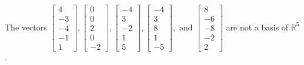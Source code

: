 \begin{exercise}
\begin{exerciseStatement}
  \end{exerciseStatement}
  \begin{exerciseAnswer}
   The vectors \(\left[\begin{array}{r}
4 \\
-3 \\
-4 \\
-1 \\
1
\end{array}\right] , \left[\begin{array}{r}
0 \\
0 \\
2 \\
0 \\
-2
\end{array}\right] , \left[\begin{array}{r}
-4 \\
3 \\
-2 \\
1 \\
5
\end{array}\right] , \left[\begin{array}{r}
-4 \\
3 \\
8 \\
1 \\
-5
\end{array}\right] , \text{ and } \left[\begin{array}{r}
8 \\
-6 \\
-8 \\
-2 \\
2
\end{array}\right]\) 
  	 are not  a basis of \(\mathbb{R}^5\).
  


  \end{exerciseAnswer}
\end{exercise}